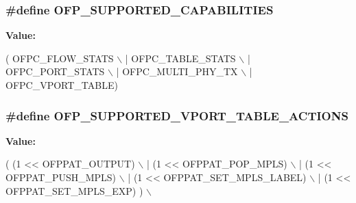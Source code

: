 \subsubsection[{\texorpdfstring{O\+F\+P\+\_\+\+S\+U\+P\+P\+O\+R\+T\+E\+D\+\_\+\+C\+A\+P\+A\+B\+I\+L\+I\+T\+I\+ES}{OFP_SUPPORTED_CAPABILITIES}}]{\setlength{\rightskip}{0pt plus 5cm}\#define O\+F\+P\+\_\+\+S\+U\+P\+P\+O\+R\+T\+E\+D\+\_\+\+C\+A\+P\+A\+B\+I\+L\+I\+T\+I\+ES}\hypertarget{openflow-interface_8h_a0752d182ccd1a1b4c01c5dc0e2149f1d}{}\label{openflow-interface_8h_a0752d182ccd1a1b4c01c5dc0e2149f1d}
{\bfseries Value\+:}
\begin{DoxyCode}
( OFPC\_FLOW\_STATS            \(\backslash\)
                                     | OFPC\_TABLE\_STATS         \(\backslash\)
                                     | OFPC\_PORT\_STATS          \(\backslash\)
                                     | OFPC\_MULTI\_PHY\_TX        \(\backslash\)
                                     | OFPC\_VPORT\_TABLE)
\end{DoxyCode}
\subsubsection[{\texorpdfstring{O\+F\+P\+\_\+\+S\+U\+P\+P\+O\+R\+T\+E\+D\+\_\+\+V\+P\+O\+R\+T\+\_\+\+T\+A\+B\+L\+E\+\_\+\+A\+C\+T\+I\+O\+NS}{OFP_SUPPORTED_VPORT_TABLE_ACTIONS}}]{\setlength{\rightskip}{0pt plus 5cm}\#define O\+F\+P\+\_\+\+S\+U\+P\+P\+O\+R\+T\+E\+D\+\_\+\+V\+P\+O\+R\+T\+\_\+\+T\+A\+B\+L\+E\+\_\+\+A\+C\+T\+I\+O\+NS}\hypertarget{openflow-interface_8h_ab9bb642585ce807c268b3c8b492f12ba}{}\label{openflow-interface_8h_ab9bb642585ce807c268b3c8b492f12ba}
{\bfseries Value\+:}
\begin{DoxyCode}
( (1 << OFPPAT\_OUTPUT)                \(\backslash\)
                                            | (1 << OFPPAT\_POP\_MPLS)            \(\backslash\)
                                            | (1 << OFPPAT\_PUSH\_MPLS)           \(\backslash\)
                                            | (1 << OFPPAT\_SET\_MPLS\_LABEL)      \(\backslash\)
                                            | (1 << OFPPAT\_SET\_MPLS\_EXP) )      \(\backslash\)
\end{DoxyCode}
